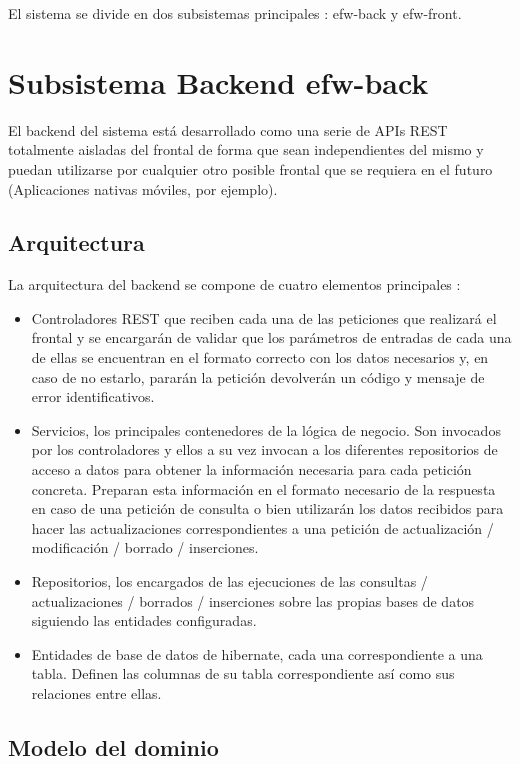 \documentclass[12pt, a4paper, twoside]{book}
\begin{document}
	El sistema se divide en dos subsistemas principales : efw-back y efw-front.
	
	\section{Subsistema Backend efw-back}
	
	El backend del sistema está desarrollado como una serie de APIs REST totalmente aisladas del frontal de forma que sean independientes del mismo y puedan utilizarse por cualquier otro posible frontal que se requiera en el futuro (Aplicaciones nativas móviles, por ejemplo).
	
	\subsection{Arquitectura}
	
	La arquitectura del backend se compone de cuatro elementos principales :
	
	\begin{itemize}
		\item Controladores REST que reciben cada una de las peticiones que realizará el frontal y se encargarán de validar que los parámetros de entradas de cada una de ellas se encuentran en el formato correcto con los datos necesarios y, en caso de no estarlo, pararán la petición devolverán un código y mensaje de error identificativos.
		\item Servicios, los principales contenedores de la lógica de negocio. Son invocados por los controladores y ellos a su vez invocan a los diferentes repositorios de acceso a datos para obtener la información necesaria para cada petición concreta. Preparan esta información en el formato necesario de la respuesta en caso de una petición de consulta o bien utilizarán los datos recibidos para hacer las actualizaciones correspondientes a una petición de actualización / modificación / borrado / inserciones.
		\item Repositorios, los encargados de las ejecuciones de las consultas / actualizaciones / borrados / inserciones sobre las propias bases de datos siguiendo las entidades configuradas.
		\item Entidades de base de datos de hibernate, cada una correspondiente a una tabla. Definen las columnas de su tabla correspondiente así como sus relaciones entre ellas.
	\end{itemize} 
	
	\subsection{Modelo del dominio}    
\end{document}

